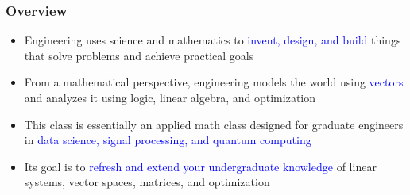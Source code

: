 \documentclass[10pt,english,aspectratio=169]{beamer}
\begin{document}
\begin{frame} \frametitle{Overview}

\begin{itemize}
  \setlength\itemsep{4mm}
  \item Engineering uses science and mathematics to \textcolor{blue}{invent, design, and build} things that solve problems and achieve practical goals
  
  \item From a mathematical perspective, engineering models the world using \textcolor{blue}{vectors} and analyzes it using logic, linear algebra, and optimization
  
  \item This class is essentially an applied math class designed for graduate engineers in \textcolor{blue}{data science, signal processing, and quantum computing}
  
  \item Its goal is to \textcolor{blue}{refresh and extend your undergraduate knowledge} of linear systems, vector spaces, matrices, and optimization

\end{itemize}


		  
\end{frame}
\end{document}
